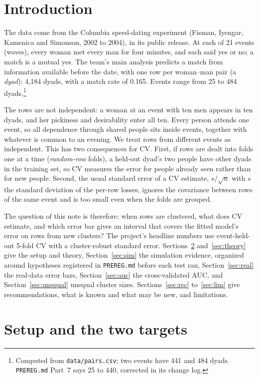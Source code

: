 \documentclass[11pt]{amsart}
\theoremstyle{plain}
\theoremstyle{definition}
\theoremstyle{remark}
\begin{document}
\section{Introduction}

The data come from the Columbia speed-dating experiment (Fisman, Iyengar, Kamenica and Simonson, 2002 to 2004), in its public release. At each of 21 events (waves), every woman met every man for four minutes, and each said yes or no; a match is a mutual yes. The team's main analysis predicts a match from information available before the date, with one row per woman--man pair (a \emph{dyad}): 4,184 dyads, with a match rate of 0.165. Events range from 25 to 484 dyads.\footnote{Computed from \texttt{data/pairs.csv}; two events have 441 and 484 dyads. \texttt{PREREG.md} Part~7 says 25 to 440, corrected in its change log.}

The rows are not independent: a woman at an event with ten men appears in ten dyads, and her pickiness and desirability enter all ten. Every person attends one event, so all dependence through shared people sits inside events, together with whatever is common to an evening. We treat rows from different events as independent. This has two consequences for CV. First, if rows are dealt into folds one at a time (\emph{random-row} folds), a held-out dyad's two people have other dyads in the training set, so CV measures the error for people already seen rather than for new people. Second, the usual standard error of a CV estimate, $s/\sqrt n$ with $s$ the standard deviation of the per-row losses, ignores the covariance between rows of the same event and is too small even when the folds are grouped.

The question of this note is therefore: when rows are clustered, what does CV estimate, and which error bar gives an interval that covers the fitted model's error on rows from new clusters? The project's headline numbers use event-held-out 5-fold CV with a cluster-robust standard error. Sections~\ref{sec:setup} and~\ref{sec:theory} give the setup and theory, Section~\ref{sec:sim} the simulation evidence, organized around hypotheses registered in \texttt{PREREG.md} before each test ran, Section~\ref{sec:real} the real-data error bars, Section~\ref{sec:auc} the cross-validated AUC, and Section~\ref{sec:unequal} unequal cluster sizes. Sections~\ref{sec:rec} to~\ref{sec:lim} give recommendations, what is known and what may be new, and limitations.

\section{Setup and the two targets}\label{sec:setup}
\end{document}

